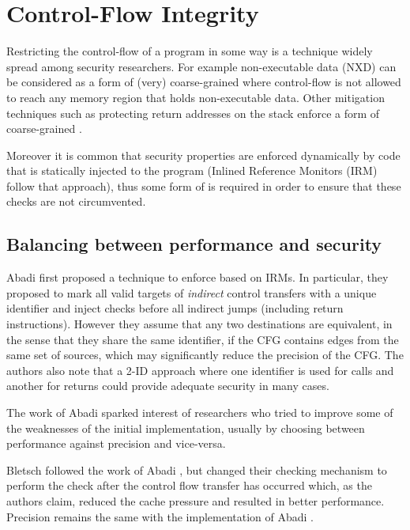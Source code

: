 \chapter{Control-Flow Integrity}\label{ch:cfi}

Restricting the control-flow of a program in some way is a technique widely
spread among security researchers. For example non-executable data (NXD)
can be considered as a form of (very) coarse-grained \CFI where control-flow is
not allowed to reach any memory region that holds non-executable data. Other
mitigation techniques such as protecting return addresses on the stack enforce
a form of coarse-grained \CFI.

Moreover it is common that security properties are enforced dynamically by code
that is statically injected to the program (\EG Inlined Reference Monitors (IRM)
\cite{Erlingsson04} follow that approach), thus some form of \CFI is required in
order to ensure that these checks are not circumvented. 

\section{Balancing between performance and security}\label{sec:security_cfi}

Abadi \ETAL first proposed a technique to enforce \CFI based on IRMs. 
In particular, they proposed to mark all valid targets of \emph{indirect} 
control transfers with a unique identifier and inject checks before all 
indirect jumps (including return instructions). However they assume that any 
two destinations are equivalent, in the sense that they share the same 
identifier, if the CFG contains edges from the same  set of sources, which may
significantly reduce the precision of the CFG. 
The authors also note that a 2-ID approach where one identifier is used for 
calls and another for returns could provide adequate security in many cases. 

The work of Abadi \ETAL sparked interest of researchers who tried to improve
some of the weaknesses of the initial implementation, usually by choosing 
between performance against precision and vice-versa.

Bletsch \ETAL \cite{Bletsch:2011:MCA:2076732.2076783} followed the work
of Abadi \ETAL, but changed their checking mechanism to perform the check
after the control flow transfer has occurred which, as the authors claim,
reduced the cache pressure and resulted in better performance. Precision remains
the same with the implementation of Abadi \ETAL.

